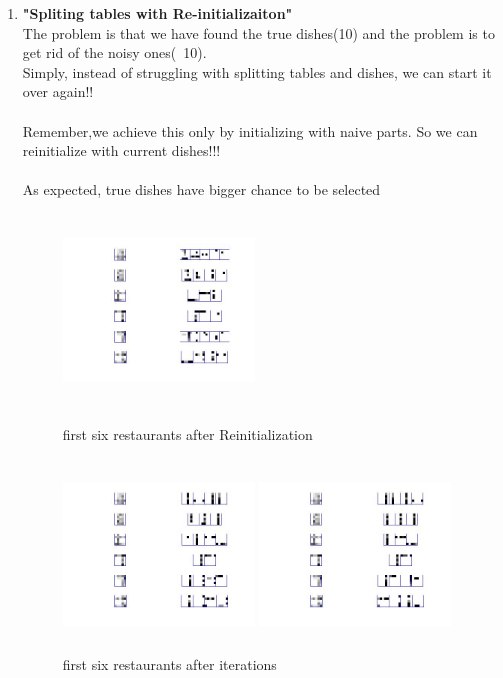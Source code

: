 \documentclass{article}
\begin{document}
\begin{spacing}{1.1}
\begin{enumerate}
\item {\bf "Spliting tables with Re-initializaiton"}\\
The problem is that we have found the true dishes(10) and the problem is to get rid of the noisy ones(~10).\\
Simply, instead of struggling with splitting tables and dishes, we can start it over again!!\\ \\
Remember,we achieve this only by initializing with naive parts. So we can reinitialize with current dishes!!!\\ \\
As expected, true dishes have bigger chance to be selected~~
\begin{figure}[h] 
  \begin{minipage}[b]{0.3\textwidth} 
    \centering 
    \includegraphics[width=2in,height=2in]{2_init_part.jpg} 
    \caption{first six restaurants after Reinitialization}
    \label{fig:by:table} 
  \end{minipage}%
  \begin{minipage}[b]{0.3\textwidth} 
    \centering 
    \includegraphics[width=2in,height=2in]{2_init_part_end.jpg} 
    \caption{first six restaurants after iterations}
    \label{fig:by:table}  
   \end{minipage}%
\begin{minipage}[b]{0.3\textwidth} 
    \centering 
    \includegraphics[width=2in,height=2in]{2_init_part_end2.jpg} 

\end{minipage}
\end{figure}
\end{enumerate}
\end{spacing}
\end{document}
